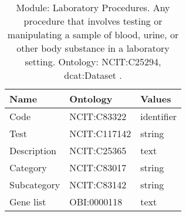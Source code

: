 \documentclass{article}
\begin{document}
\begin{table}[htb]
\begin{tabular}{lll}
Name & Ontology & Values \\
\hline
Code & NCIT:C83322  & identifier \\
Test & NCIT:C117142  & string \\
Description & NCIT:C25365  & text \\
Category & NCIT:C83017  & string \\
Subcategory & NCIT:C83142  & string \\
Gene list & OBI:0000118  & text \\
\hline
\end{tabular}
\caption[Module: Laboratory Procedures]{\label{table:table10} Module: Laboratory Procedures. Any procedure that involves testing or manipulating a sample of blood, urine, or other body substance in a laboratory setting. Ontology: NCIT:C25294, dcat:Dataset . }
\end{table}
\end{document}
